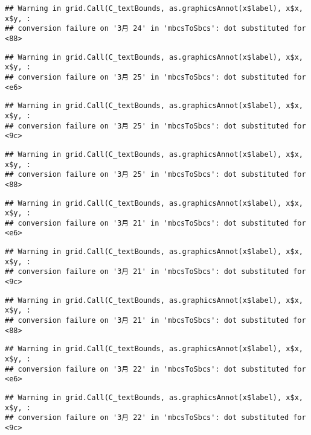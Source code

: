 \documentclass[
]{article}
\begin{document}
\begin{verbatim}
## Warning in grid.Call(C_textBounds, as.graphicsAnnot(x$label), x$x, x$y, :
## conversion failure on '3月 24' in 'mbcsToSbcs': dot substituted for <88>
\end{verbatim}

\begin{verbatim}
## Warning in grid.Call(C_textBounds, as.graphicsAnnot(x$label), x$x, x$y, :
## conversion failure on '3月 25' in 'mbcsToSbcs': dot substituted for <e6>
\end{verbatim}

\begin{verbatim}
## Warning in grid.Call(C_textBounds, as.graphicsAnnot(x$label), x$x, x$y, :
## conversion failure on '3月 25' in 'mbcsToSbcs': dot substituted for <9c>
\end{verbatim}

\begin{verbatim}
## Warning in grid.Call(C_textBounds, as.graphicsAnnot(x$label), x$x, x$y, :
## conversion failure on '3月 25' in 'mbcsToSbcs': dot substituted for <88>
\end{verbatim}

\begin{verbatim}
## Warning in grid.Call(C_textBounds, as.graphicsAnnot(x$label), x$x, x$y, :
## conversion failure on '3月 21' in 'mbcsToSbcs': dot substituted for <e6>
\end{verbatim}

\begin{verbatim}
## Warning in grid.Call(C_textBounds, as.graphicsAnnot(x$label), x$x, x$y, :
## conversion failure on '3月 21' in 'mbcsToSbcs': dot substituted for <9c>
\end{verbatim}

\begin{verbatim}
## Warning in grid.Call(C_textBounds, as.graphicsAnnot(x$label), x$x, x$y, :
## conversion failure on '3月 21' in 'mbcsToSbcs': dot substituted for <88>
\end{verbatim}

\begin{verbatim}
## Warning in grid.Call(C_textBounds, as.graphicsAnnot(x$label), x$x, x$y, :
## conversion failure on '3月 22' in 'mbcsToSbcs': dot substituted for <e6>
\end{verbatim}

\begin{verbatim}
## Warning in grid.Call(C_textBounds, as.graphicsAnnot(x$label), x$x, x$y, :
## conversion failure on '3月 22' in 'mbcsToSbcs': dot substituted for <9c>
\end{verbatim}
\end{document}
